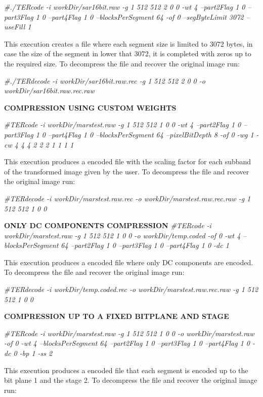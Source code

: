 \documentclass[a4paper,10pt]{article}
\begin{document}
\emph{\#./TERcode -i workDir/sar16bit.raw -g 1 512 512 2 0 0 -wt 4 --part2Flag
1 0 --part3Flag 1 0 --part4Flag 1 0 --blocksPerSegment 64
 -of 0 --segByteLimit 3072 --useFill 1}

This execution creates a file where each segment size is limited to
3072 bytes, in case the size of the segment in lower that 3072, it is
completed with zeros up to the required size. To decompress
the file and recover the original image run:

\emph{\#./TERdecode -i workDir/sar16bit.raw.rec -g 1 512 512 2 0 0 -o
  workDir/sar16bit.raw.rec.raw} 

\vspace{0.25cm}\textbf{COMPRESSION USING CUSTOM WEIGHTS}\vspace{0.25cm} 

\emph{\#TERcode -i workDir/marstest.raw -g 1 512 512 1 0 0 -wt 4
  --part2Flag 1 0 --part3Flag 1 0 --part4Flag 1 0 --blocksPerSegment
  64 --pixelBitDepth 8 -of 0 -wg 1 -cw 4 4 4 2 2
  2 1 1 1 1} 

This execution produces a encoded file with the scaling factor for
each subband of the transformed image given by the user. To decompress
the file and recover the original image run:

\emph{\#TERdecode -i workDir/marstest.raw.rec -o
  workDir/marstest.raw.rec.raw -g 1 512 512 1 0 0} 

\vspace{0.25cm}\textbf{ONLY DC COMPONENTS COMPRESSION}\vspace{0.25cm}
\emph{\#TERcode -i workDir/marstest.raw -g 1 512 512 1 0 0 -o
workDir/temp.coded -of 0 -wt 4 --blocksPerSegment 64 --part2Flag 1 0
--part3Flag 1 0 --part4Flag 1 0 -dc 1}

This execution produces a encoded file where only DC components are
encoded. To decompress the file and recover the original image run:

\emph{\#TERdecode -i workDir/temp.coded.rec -o
  workDir/marstest.raw.rec.raw -g 1 512 512 1 0 0} 

\vspace{0.25cm}\textbf{COMPRESSION UP TO A FIXED BITPLANE AND
  STAGE}\vspace{0.25cm}   

\emph{\#TERcode -i workDir/marstest.raw -g 1 512 512 1 0 0 -o
workDir/marstest.raw -of 0 -wt 4 --blocksPerSegment 64 --part2Flag 1 0
--part3Flag 1 0 --part4Flag 1 0 -dc 0 -bp 1 -ss 2}

This execution produces a encoded file that each segment is encoded up
to the bit plane 1 and the stage 2. To decompress
the file and recover the original image run:
\end{document}
